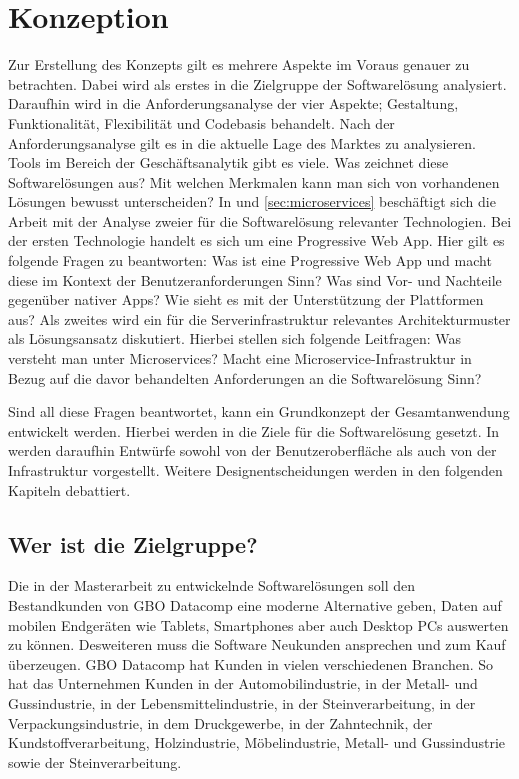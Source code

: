 \chapter{Konzeption}
\label{chap:konzeption}

Zur Erstellung des Konzepts gilt es mehrere Aspekte im Voraus genauer zu betrachten.
Dabei wird als erstes in  die Zielgruppe der Softwarelösung analysiert. Daraufhin
wird in  die Anforderungsanalyse der vier Aspekte; Gestaltung, Funktionalität,
Flexibilität und Codebasis behandelt. Nach der Anforderungsanalyse gilt es
in  die aktuelle Lage
des Marktes zu analysieren. Tools im Bereich der Geschäftsanalytik gibt es viele. \cite{WikiBISoftware}
Was zeichnet diese Softwarelösungen aus? Mit welchen Merkmalen kann man sich von vorhandenen Lösungen
bewusst unterscheiden? In  und \ref{sec:microservices} beschäftigt
sich die Arbeit mit der Analyse zweier für die Softwarelösung relevanter Technologien.
Bei der ersten Technologie handelt es sich um eine Progressive Web App. Hier gilt es folgende
Fragen zu beantworten: Was ist eine Progressive Web App und macht diese 
im Kontext der Benutzeranforderungen Sinn? Was sind Vor- und Nachteile gegenüber nativer Apps?
Wie sieht es mit der Unterstützung der Plattformen aus? Als zweites wird ein für die
Serverinfrastruktur relevantes Architekturmuster als Lösungsansatz diskutiert. Hierbei
stellen sich folgende Leitfragen: Was versteht man unter Microservices? Macht eine
Microservice-Infrastruktur in Bezug auf die davor behandelten Anforderungen an die
Softwarelösung Sinn?

Sind all diese Fragen beantwortet, kann ein Grundkonzept der Gesamtanwendung entwickelt werden.
Hierbei werden in  die Ziele für die Softwarelösung gesetzt. In 
werden daraufhin Entwürfe sowohl von der Benutzeroberfläche als auch von der Infrastruktur vorgestellt.
Weitere Designentscheidungen werden in den folgenden Kapiteln debattiert.

\section{Wer ist die Zielgruppe?}
\label{sec:weristmeinezielgruppe}
Die in der Masterarbeit zu entwickelnde Softwarelösungen
soll den Bestandkunden von GBO Datacomp eine moderne Alternative geben, Daten 
auf mobilen Endgeräten wie Tablets, Smartphones aber auch Desktop PCs auswerten zu können.
Desweiteren muss die Software Neukunden ansprechen und zum Kauf überzeugen. GBO Datacomp
hat Kunden in vielen verschiedenen Branchen. So hat das Unternehmen Kunden in der
Automobilindustrie, in der Metall- und Gussindustrie, in der Lebensmittelindustrie,
in der Steinverarbeitung, in der Verpackungsindustrie, in dem Druckgewerbe, in der
Zahntechnik, der Kundstoffverarbeitung, Holzindustrie, Möbelindustrie, Metall- und Gussindustrie sowie
der Steinverarbeitung.\cite{GBODatacompBranchenloesungen}

